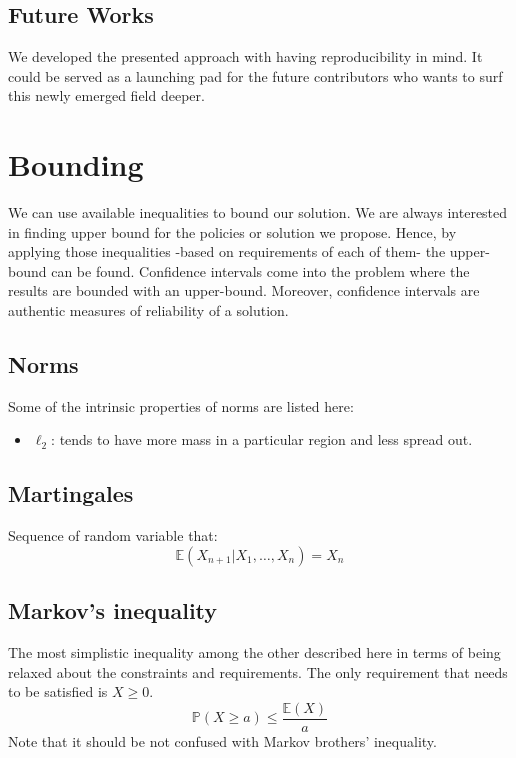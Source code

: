 \documentclass[letterpaper,12pt]{article}
\begin{document}
    \subsection{Future Works}
    We developed the presented approach with having reproducibility in mind. It could be served as a launching pad for the future contributors who wants to surf this newly emerged field deeper.


    \section{Bounding}
    We can use available inequalities to bound our solution. We are always interested in finding upper bound for the policies or solution we propose. Hence, by applying those inequalities -based on requirements of each of them- the upper-bound can be found. Confidence intervals come into the problem where the results are bounded with an upper-bound. Moreover, confidence intervals are authentic measures of reliability of a solution.

    \subsection{Norms}
    Some of the intrinsic properties of norms are listed here:
    \begin{itemize}
        \item $\ell_2$: tends to have more mass in a particular region and less spread out.
    \end{itemize}

    \subsection{Martingales}
    Sequence of random variable that:
    \begin{equation}
        \mathbb { E } \left( X _ { n + 1 } | X _ { 1 } , \ldots , X _ { n } \right) = X _ { n }
    \end{equation}

    \subsection{Markov's inequality}
    The most simplistic inequality among the other described here in terms of being relaxed about the constraints and requirements. The only requirement that needs to be satisfied is $X \geq 0$.
    \begin{equation}
        \mathbb {P}(X \geq a ) \leq \frac { \mathbb { E}( X ) } { a }
    \end{equation}
    Note that it should be not confused with Markov brothers' inequality.
\end{document}
